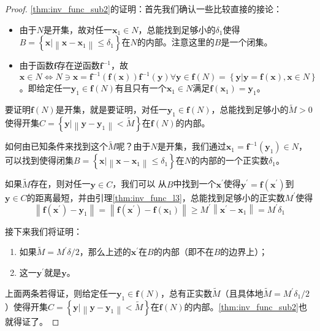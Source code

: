 \documentclass[main.tex]{subfiles}
\begin{document}
\begin{proof}
\ref{thm:inv_func_sub2}的证明：首先我们确认一些比较直接的接论：
\begin{itemize}
    \item 由于$N$是开集，故对任一$\mathbf{x}_1\in N$，总能找到足够小的$\delta_1$使得$B=\left\{\mathbf{x}|\left\|\mathbf{x}-\mathbf{x}_1\right\|\leq\delta_1\right\}$在$N$的内部。注意这里的$B$是一个闭集。
    \item 由于函数$\mathbf{f}$存在逆函数$\mathbf{f}^{-1}$，故$\mathbf{x}\in N\Leftrightarrow N\ni \mathbf{x}= \mathbf{f}^{-1}\left(\mathbf{f}\left(\mathbf{x}\right)\right)\mathbf{f}^{-1}\left(\mathbf{y}\right)\forall \mathbf{y}\in\mathbf{f}\left(N\right)=\left\{\mathbf{y}|\mathbf{y}=\mathbf{f}\left(\mathbf{x}\right),\mathbf{x}\in N\right\}$。即给定任一$\mathbf{y}_1\in\mathbf{f}\left(N\right)$有且只有一个$\mathbf{x}_1\in N$满足$\mathbf{f}\left(\mathbf{x}_1\right)=\mathbf{y}_1$。
\end{itemize}

要证明$\mathbf{f}\left(N\right)$是开集，就是要证明，对任一$\mathbf{y}_1\in\mathbf{f}\left(N\right)$，总能找到足够小的$\widetilde{M}>0$使得开集$C=\left\{\mathbf{y}|\left\|\mathbf{y}-\mathbf{y}_1\right\|<\widetilde{M}\right\}$在$\mathbf{f}\left(N\right)$的内部。

如何由已知条件来找到这个$\widetilde{M}$呢？由于$N$是开集，我们通过$\mathbf{x}_1=\mathbf{f}^{-1}\left(\mathbf{y}_1\right)\in N$，可以找到使得闭集$B=\left\{\mathbf{x}|\left\|\mathbf{x}-\mathbf{x}_1\right\|\leq\delta_1\right\}$在$N$的内部的一个正实数$\delta_1$。

如果$\widetilde{M}$存在，则对任一$\mathbf{y}\in C$，我们可以
从$B$中找到一个$\mathbf{x}^\prime$使得$\mathbf{y}^\prime=\mathbf{f}\left(\mathbf{x}^\prime\right)$到$\mathbf{y}\in C$的距离最短，并由引理\ref{thm:inv_func_l3}，总能找到足够小的正实数$M^\prime$使得
\[\left\|\mathbf{f}\left(\mathbf{x}^\prime\right)-\mathbf{y}_1\right\|=\left\|\mathbf{f}\left(\mathbf{x}^\prime\right)-\mathbf{f}\left(\mathbf{x}_1\right)\right\|\geq M^\prime\left\|\mathbf{x}^\prime-\mathbf{x}_1\right\|=M^\prime\delta_1
\]

接下来我们将证明：
\begin{enumerate}[label=\roman*]
\item\label{thm:inv_func_sub2_sub1} 如果$\widetilde{M}=M^\prime\delta/2$，那么上述的$\mathbf{x}^\prime$在$B$的内部（即不在$B$的边界上）；
\item\label{thm:inv_func_sub2_sub2} 这一$\mathbf{y}^\prime$就是$\mathbf{y}$。
\end{enumerate}
上面两条若得证，则给定任一$\mathbf{y}_1\in\mathbf{f}\left(N\right)$，总有正实数$\widetilde{M}$（且具体地$\widetilde{M}=M^\prime\delta_1/2$）使得开集$C=\left\{\mathbf{y}|\left\|\mathbf{y}-\mathbf{y}_1\right\|<\widetilde{M}\right\}$在$\mathbf{f}\left(N\right)$的内部。\ref{thm:inv_func_sub2}也就得证了。


\end{proof}
\end{document}
